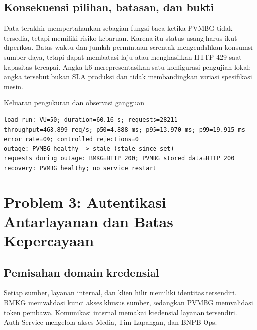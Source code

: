 \documentclass{fairmeta}
\begin{document}
\subsection{Konsekuensi pilihan, batasan, dan bukti}

Data terakhir mempertahankan sebagian fungsi baca ketika PVMBG tidak tersedia, tetapi memiliki risiko kebaruan. Karena itu status usang harus ikut diperiksa. Batas waktu dan jumlah permintaan serentak mengendalikan konsumsi sumber daya, tetapi dapat membatasi laju atau menghasilkan HTTP 429 saat kapasitas tercapai. Angka k6 merepresentasikan satu konfigurasi pengujian lokal; angka tersebut bukan SLA produksi dan tidak membandingkan variasi spesifikasi mesin.


\begin{evidencebox}{Keluaran pengukuran dan observasi gangguan}
\begin{lstlisting}
load run: VU=50; duration=60.16 s; requests=28211
throughput=468.899 req/s; p50=4.888 ms; p95=13.970 ms; p99=19.915 ms
error_rate=0%; controlled_rejections=0
outage: PVMBG healthy -> stale (stale_since set)
requests during outage: BMKG=HTTP 200; PVMBG stored data=HTTP 200
recovery: PVMBG healthy; no service restart
\end{lstlisting}
\end{evidencebox}

\section{Problem 3: Autentikasi Antarlayanan dan Batas Kepercayaan}

\subsection{Pemisahan domain kredensial}

Setiap sumber, layanan internal, dan klien hilir memiliki identitas tersendiri. BMKG memvalidasi kunci akses khusus sumber, sedangkan PVMBG memvalidasi token pembawa. Komunikasi internal memakai kredensial layanan tersendiri. Auth Service mengelola akses Media, Tim Lapangan, dan BNPB Ops.
\end{document}
